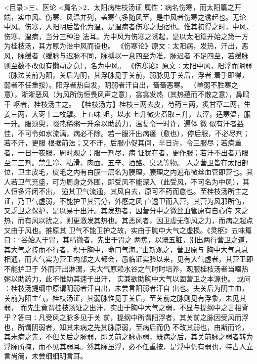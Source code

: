 \documentclass[a4paper,12pt,UTF8,twoside]{ctexbook}
\begin{document}
<目录>三、医论
<篇名>2．太阳病桂枝汤证
属性：病名伤寒，而太阳篇之开端，实中风、伤寒、风温并列，盖寒气多随风至，是中风者伤寒之诱起也。无论 
中风、伤寒，入阳明后皆化为温，是温病者伤寒之归宿也。惟其初得之时，中风、伤寒、温病，当分三种治 
法耳。为中风为伤寒之诱起，是以太阳篇开始之第一方为桂枝汤，其方原为治中风而设也。 
《伤寒论》原文∶太阳病，发热，汗出，恶风，脉缓者（缓脉与迟脉不同，脉搏以一息四至为准，脉迟者 
不足四至，若缓脉则至数不改似有懒动之意），名为中风。 
《伤寒论》原文∶太阳中风，阳浮而阴弱（脉法关前为阳，关后为阴，其浮脉见于关前，弱脉见于关后，浮者 
着手即得，弱者不任重按）。阳浮者热自发，阴弱者汗自出，啬啬恶寒。 
（单弱不胜寒之意），淅淅恶风（为风所伤恒畏风声之意），翕翕发热（其热蕴而不散之意），鼻鸣干 
呕者，桂枝汤主之。 
【桂枝汤方】桂枝三两去皮，芍药三两，炙甘草二两，生姜三两，大枣十二枚擘。上五味 咀，以水 
七升微火煮取三升，去滓，适寒温，服一升。服须臾，啜热稀粥一升余以助药力，温复令一时许，遍体 微 
似有汗者益佳，不可令如水流漓，病必不除。若一服汗出病瘥（愈也），停后服，不必尽剂；若不汗，更服 
根据前法；又不汗，后服小促其间，半日许，令三服尽；若病重者，一日一夜服，周时观之；服一剂尽，病 
证犹在者，更作服；若汗不出者乃服至二三剂。禁生冷、粘滑、肉面、五辛、酒酪、臭恶等物。 
人之营卫皆在太阳部位，卫主皮毛，皮毛之内有白膜一层名为腠理，腠理之内遍布微丝血管即营也。其 
人若卫气充盛，可为周身之外围，即受风不能深入（此受风，不可名为中风），其人恒多汗闭不出， 
迨其卫气流通，其风自去，原可不药而愈也。至桂枝汤所主之证，乃卫气虚弱，不能护卫其营分，外感之风 
直透卫而入营，其营为风邪所伤，又乏卫之保护，是以易于出汗。其发热者，因营分中之微丝血管原有自心传 
来之热，而有风以扰之，则更激发其热也。其恶风者，因卫虚无御风之力，而病之起点又由于风也。推原其 
卫气不能卫护之故，实由于胸中大气之虚损。《灵枢》五味篇曰∶“谷始入于胃，其精微者，先出于胃之 
两焦，以溉五脏，别出两行营卫之道，其大气之抟而不行者，积于胸中，命曰气海。”由斯观之，营卫原与 
胸中大气息息相通，而大气实为营卫内部之大都会，愚临证实验以来，见有大气虚者，其营卫即不能护卫于 
外而汗出淋漓，夫大气原赖水谷之气时时培养，观服桂枝汤者当啜热粥以助药力，此不惟助其速于出汗， 
实兼欲助胸中大气以固营卫之本源也。 
或问∶桂枝汤提纲中原谓阴弱者汗自出，未尝言阳弱者汗自 
出也。夫关后为阴主血，关前为阳主气，桂枝汤证，其弱脉惟见于关后，至关前之脉则见有浮象，未见其弱， 
而先生竟谓桂枝汤证之出汗，实由于胸中大气之弱，不显与提纲中之言相背乎？答曰∶凡受风之脉多见于关 
前，提纲中所谓阳浮者，其关前之脉因受风而浮也，所谓阴弱者，知其未病之先其脉原弱，至病后而仍 
不改其弱也，由斯而论，其未病之先，不但关后之脉弱，即关前之脉亦弱，既病之后，其关前脉之弱者转为 
浮脉所掩，而不见其弱耳。然其脉虽浮，必不任重按，是浮中仍有弱也，特古人立言尚简，未尝细细明言耳。 
\end{document}
